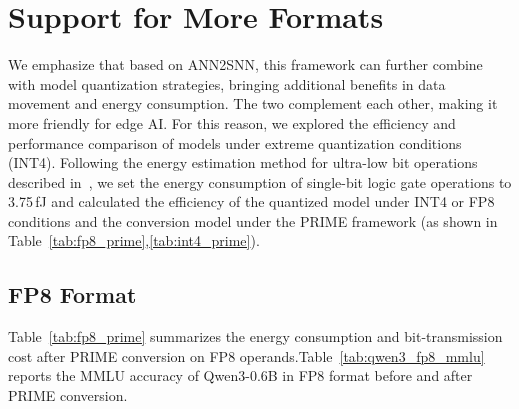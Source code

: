 \section{Support for More Formats\label{sec:fp8_int4}}

We emphasize that based on ANN2SNN, this framework can further combine with model quantization strategies, bringing additional benefits in data movement and energy consumption. The two complement each other, making it more friendly for edge AI. For this reason, we explored the efficiency and performance comparison of models under extreme quantization conditions (INT4). Following the energy estimation method for ultra-low bit operations described in~\cite{liu2020birealnet,qin2020binary}, we set the energy consumption of single-bit logic gate operations to 3.75\,fJ and calculated the efficiency of the quantized model under INT4 or FP8 conditions and the conversion model under the PRIME framework (as shown in Table~\ref{tab:fp8_prime},\ref{tab:int4_prime}).

\subsection{FP8 Format}

Table~\ref{tab:fp8_prime} summarizes the energy consumption and bit-transmission cost after PRIME conversion on FP8 operands.Table~\ref{tab:qwen3_fp8_mmlu} reports the MMLU accuracy of Qwen3-0.6B in FP8 format before and after PRIME conversion.

\begin{table}[htbp]
  \centering
  \scriptsize
  \caption{Energy and bit-transmission cost of FP8 format after PRIME conversion.}
  \label{tab:fp8_prime}
\end{table}

